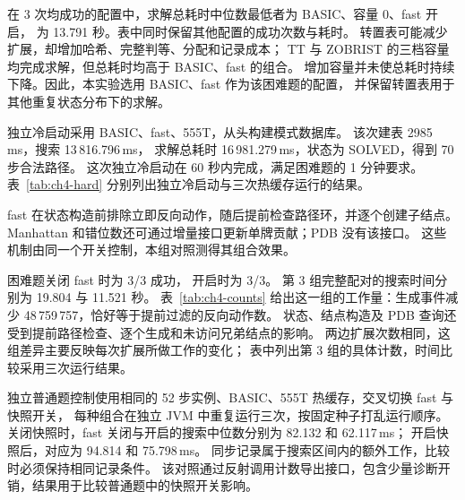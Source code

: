 在 3 次均成功的配置中，求解总耗时中位数最低者为 BASIC、容量 0、fast 开启，
为 13.791 秒。表中同时保留其他配置的成功次数与耗时。
转置表可能减少扩展，却增加哈希、完整判等、分配和记录成本；
TT 与 ZOBRIST 的三档容量均完成求解，但总耗时均高于 BASIC、fast 的组合。
增加容量并未使总耗时持续下降。因此，本实验选用 BASIC、fast 作为该困难题的配置，
并保留转置表用于其他重复状态分布下的求解。

独立冷启动采用 BASIC、fast、555T，从头构建模式数据库。
该次建表 2985\,ms，搜索 13\,816.796\,ms，
求解总耗时 16\,981.279\,ms，状态为 SOLVED，得到 70 步合法路径。
这次独立冷启动在 60 秒内完成，满足困难题的 1 分钟要求。
表~\ref{tab:ch4-hard} 分别列出独立冷启动与三次热缓存运行的结果。
\FloatBarrier

\par\vspace{2bp}

fast 在状态构造前排除立即反向动作，随后提前检查路径环，并逐个创建子结点。
Manhattan 和错位数还可通过增量接口更新单牌贡献；PDB 没有该接口。
这些机制由同一个开关控制，本组对照测得其组合效果。

困难题关闭 fast 时为 3/3 成功，
开启时为 3/3。
第 3 组完整配对的搜索时间分别为 19.804 与 11.521 秒。
表~\ref{tab:ch4-counts} 给出这一组的工作量：生成事件减少
48\,759\,757，恰好等于提前过滤的反向动作数。
状态、结点构造及 PDB 查询还受到提前路径检查、逐个生成和未访问兄弟结点的影响。
两边扩展次数相同，这组差异主要反映每次扩展所做工作的变化；
表中列出第 3 组的具体计数，时间比较采用三次运行结果。

独立普通题控制使用相同的 52 步实例、BASIC、555T 热缓存，交叉切换 fast 与快照开关，
每种组合在独立 JVM 中重复运行三次，按固定种子打乱运行顺序。关闭快照时，fast 关闭与开启的搜索中位数分别为
82.132 和 62.117\,ms；
开启快照后，对应为 94.814 和 75.798\,ms。
同步记录属于搜索区间内的额外工作，比较时必须保持相同记录条件。
该对照通过反射调用计数导出接口，包含少量诊断开销，结果用于比较普通题中的快照开关影响。
\FloatBarrier

